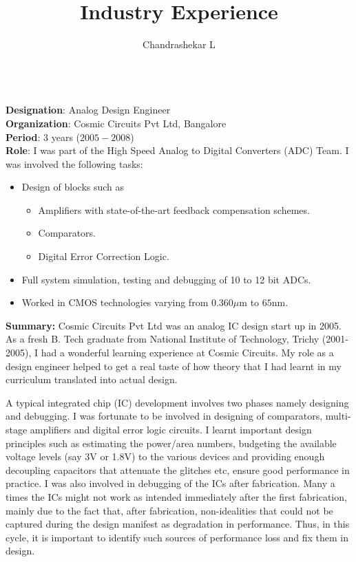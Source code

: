 \documentclass[onecolumn,12pt]{IEEEtran}
\title{\Large Industry Experience}
\author{Chandrashekar L}
\date{}
\begin{document}
\maketitle
\quad\\
\textbf{Designation}: Analog Design Engineer\\
\textbf{Organization}: Cosmic Circuits Pvt Ltd, Bangalore\\
\textbf{Period}: 3 years ($2005-2008$) \\
\textbf{Role}: I was part of the High Speed Analog to Digital Converters (ADC) Team. I was involved the following tasks:
\begin{itemize}
\item Design of blocks such as
\begin{itemize}
\item Amplifiers with state-of-the-art feedback compensation schemes.
\item Comparators.
\item Digital Error Correction Logic.
\end{itemize}
\item Full system simulation, testing and debugging of 10 to 12 bit ADCs.
\item Worked in CMOS technologies varying from $0.360\mu$m to $65$nm.
\end{itemize}
\textbf{Summary:} Cosmic Circuits Pvt Ltd was an analog IC design start up in 2005. As a fresh B. Tech graduate from National Institute of Technology, Trichy (2001-2005), I had a wonderful learning experience at Cosmic Circuits. My role as a design engineer helped to get a real taste of how theory that I had learnt in my curriculum translated into actual design.\par
A typical integrated chip (IC) development involves two phases namely designing and debugging. I was fortunate to be involved in designing of comparators, multi-stage amplifiers and digital error logic circuits. I learnt important design principles such as estimating the power/area numbers, budgeting the available voltage levels (say 3V or 1.8V) to the various devices and providing enough decoupling capacitors that attenuate the glitches etc, ensure good performance in practice. I was also involved in debugging of the ICs after fabrication. Many a times the ICs might not work as intended immediately after the first fabrication, mainly due to the fact that, after fabrication,  non-idealities that could not be captured during the design manifest as degradation in performance. Thus, in this cycle, it is important to identify such sources of performance loss and fix them in design.\par
\end{document}

